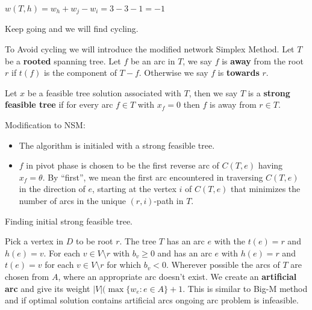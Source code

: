 			$w(T, h) = w_h + w_j - w_i = 3-3-1=-1$

			\begin{figure}[!ht]
				\centering
			\end{figure}

			Keep going and we will find cycling.

			To Avoid cycling we will introduce the modified network Simplex Method. Let $T$ be a \textbf{rooted} spanning tree. Let $f$ be an arc in $T$, we say $f$ is \textbf{away} from the root $r$ if $t(f)$ is the component of $T-f$. Otherwise we say $f$ is \textbf{towards} $r$.

			Let $x$ be a feasible tree solution associated with $T$, then we say $T$ is a \textbf{strong feasible tree} if for every arc $f \in T$ with $x_f = 0$ then $f$ is away from $r\in T$.

			Modification to NSM:
			\begin{itemize}
				\item The algorithm is initialed with a strong feasible tree.
				\item $f$ in pivot phase is chosen to be the first reverse arc of $C(T, e)$ having $x_f = \theta$. By ``first'', we mean the first arc encountered in traversing $C(T, e)$ in the direction of $e$, starting at the vertex $i$ of $C(T, e)$ that minimizes the number of arcs in the unique $(r, i)$-path in $T$.
			\end{itemize}


			Finding initial strong feasible tree.

			Pick a vertex in $D$ to be root $r$. The tree $T$ has an arc $e$ with the $t(e) = r$ and $h(e) = v$. For each $v\in V\setminus r$ with $b_v \ge 0$ and has an arc $e$ with $h(e) = r$ and $t(e) = v$ for each $v \in V\setminus r$ for which $b_v < 0$.
			Wherever possible the arcs of $T$ are chosen from $A$, where an appropriate arc doesn't exist. We create an \textbf{artificial arc} and give its weight $|V|(\max\{w_e: e\in A\} + 1$. This is similar to Big-M method and if optimal solution contains artificial arcs ongoing arc problem is infeasible.

